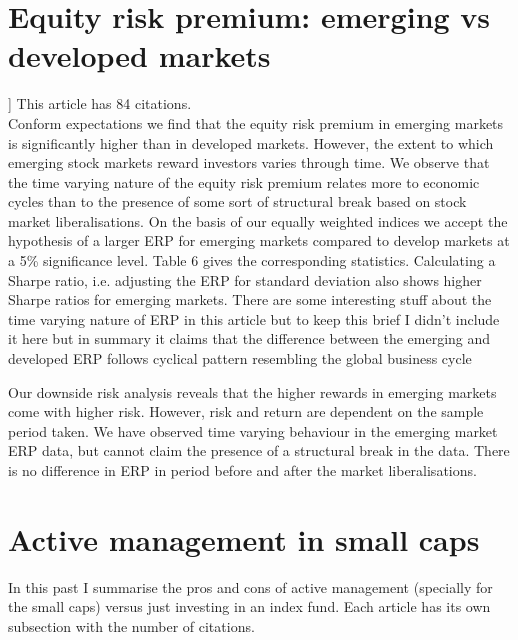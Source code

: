\documentclass[12 pt]{article}
\begin{document}
\section{Equity risk premium: emerging vs developed markets}]
This article has 84 citations.\\
 Conform expectations we find that the equity risk premium in emerging markets is significantly higher than in developed markets. However, the extent to which emerging stock markets reward investors varies through time. We observe that the time varying nature of the equity risk premium relates more to economic cycles than to the presence of some sort of structural break based on stock market liberalisations. On the basis of our equally weighted indices we accept the hypothesis of a larger ERP for emerging markets compared to develop markets at a 5\% significance level. Table 6 gives the corresponding statistics. Calculating a Sharpe ratio, i.e. adjusting the ERP for standard deviation also shows higher Sharpe ratios for emerging markets. There are some interesting stuff about the time varying nature of ERP in this article but to keep this brief I didn't include it here but in summary it claims that the difference between the emerging
and developed ERP follows cyclical pattern resembling the global business cycle
 \par Our downside risk analysis reveals that the higher rewards in emerging markets come with higher risk. However, risk and return are dependent on the sample period taken. We have observed time varying behaviour in the emerging market ERP data, but cannot claim the presence of a structural break in the data. There is no difference in ERP in period before and after the market liberalisations.
\section{Active management in small caps}
In this past I summarise the pros and cons of active management (specially for the small caps) versus just investing in an index fund. Each article has its own subsection with the number of citations. 
\end{document}
